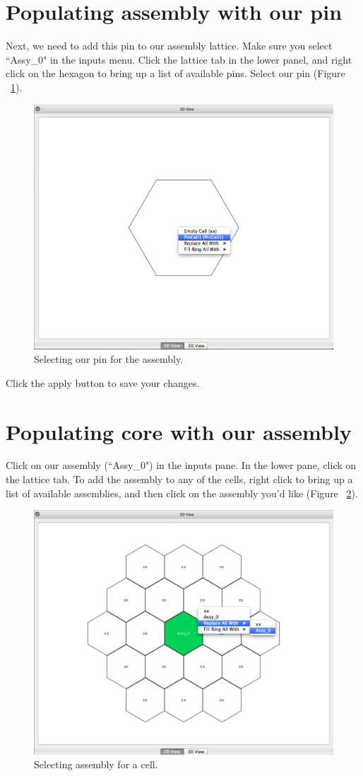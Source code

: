 \section{Populating assembly with our pin}

Next, we need to add this pin to our assembly lattice.  Make sure you select ``Assy\_0" in the inputs menu.  Click the lattice tab in the lower panel, and right click on the hexagon to bring up a list of available pins.  Select our pin (Figure ~\ref{fig:Hex18}).

\begin{figure}[H]
	\begin{center}
		\includegraphics[width=0.5\linewidth]{Images/hex-set-pin.png}
		\caption{Selecting our pin for the assembly.}
		\label{fig:Hex18}
	\end{center}
\end{figure}

Click the apply button to save your changes.

\section{Populating core with our assembly}

Click on our assembly (``Assy\_0") in the inputs pane.  In the lower pane, click on the lattice tab.  To add the assembly to any of the cells, right click to bring up a list of available assemblies, and then click on the assembly you'd like (Figure ~\ref{fig:Hex19}).

\begin{figure}[H]
	\begin{center}
		\includegraphics[width=0.5\linewidth]{Images/hex-assign-assy.png}
		\caption{Selecting assembly for a cell.}
		\label{fig:Hex19}
	\end{center}
\end{figure}

